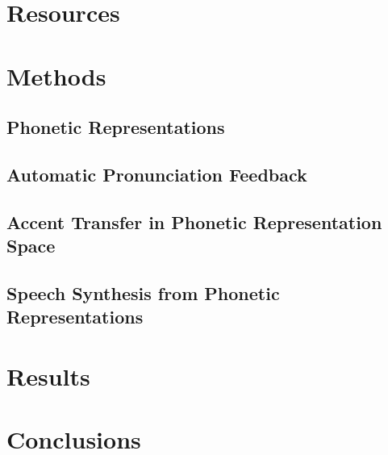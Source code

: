 \documentclass[12pt,leqno,a4paper]{article}
\begin{document}
\section{Resources}

\newpage
\section{Methods}
\subsection{Phonetic Representations}


\subsection{Automatic Pronunciation Feedback}

\subsection{Accent Transfer in Phonetic Representation Space}


\subsection{Speech Synthesis from Phonetic Representations}


\section{Results}

\section{Conclusions}



\end{document}
